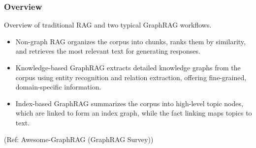 \begin{frame}[fragile]\frametitle{Overview}

Overview of traditional RAG and two typical GraphRAG workflows.

    \begin{itemize}
        \item Non-graph RAG organizes the corpus into chunks, ranks them by similarity, and retrieves the most relevant text for generating responses.
        \item Knowledge-based GraphRAG extracts detailed knowledge graphs from the corpus using entity recognition and relation extraction, offering fine-grained, domain-specific information.
        \item Index-based GraphRAG summarizes the corpus into high-level topic nodes, which are linked to form an index graph, while the fact linking maps topics to text.
    \end{itemize}
	
	{\tiny (Ref: Awesome-GraphRAG (GraphRAG Survey))}
	
\end{frame}
